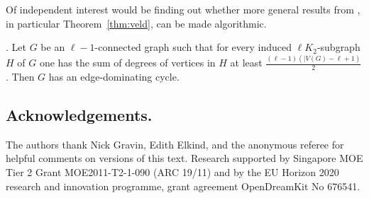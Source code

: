 \documentclass{ws-jktr}
\newcommand{\qed}{\prbox}
\begin{document}
Of independent interest would be finding out whether more general results from \cite{veldman83},
in particular Theorem~\ref{thm:veld}, can be made algorithmic.
\begin{theorem}\label{thm:veld}
{\rm \cite[Theorem~3]{veldman83}.} Let $G$ be an $\ell-1$-connected graph such that
for every induced $\ell K_2$-subgraph $H$ of $G$ one has the
sum of degrees of vertices in $H$ at least $\frac{(\ell-1)(|V(G)-\ell +1)}{2}$.
Then $G$ has  an edge-dominating cycle. \qed
\end{theorem}

\subsection*{Acknowledgements.}
The authors thank Nick Gravin, Edith Elkind, and the anonymous referee
for helpful comments on versions of this text.
Research supported by Singapore MOE Tier 2 Grant MOE2011-T2-1-090 (ARC 19/11)
and by the EU Horizon 2020 research and innovation programme, grant agreement
OpenDreamKit No 676541.



%
\end{document}

